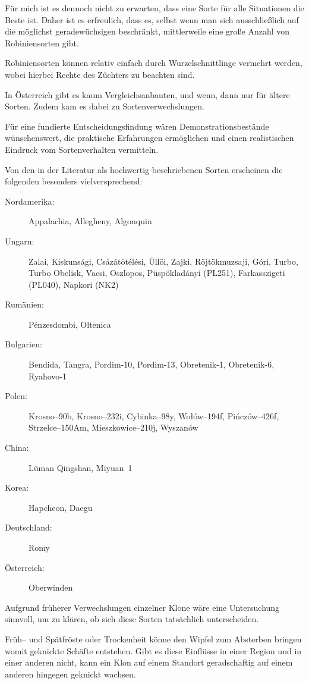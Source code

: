 \documentclass[twocolumn]{scrartcl}
\begin{document}
Für mich ist es dennoch nicht zu erwarten, dass eine Sorte für alle
Situationen die Beste ist. Daher ist es erfreulich, dass es, selbst
wenn man sich ausschließlich auf die möglichst geradewüchsigen
beschränkt, mittlerweile eine große Anzahl von Robiniensorten gibt.

Robiniensorten können relativ einfach durch Wurzelschnittlinge
vermehrt werden, wobei hierbei Rechte des Züchters zu beachten sind.

In Österreich gibt es kaum Vergleichsanbauten, und wenn, dann nur für
ältere Sorten. Zudem kam es dabei zu Sortenverwechslungen.

Für eine fundierte Entscheidungsfindung wären Demonstrationsbestände
wünschenswert, die praktische Erfahrungen ermöglichen und einen
realistischen Eindruck vom Sortenverhalten vermitteln.

Von den in der Literatur als hochwertig beschriebenen Sorten
erscheinen die folgenden besonders vielversprechend:

\begin{description}
  \item[Nordamerika:] Appalachia, Allegheny, Algonquin
  \item[Ungarn:] Zalai, Kiskunsági, Csázátötélési, Üllöi, Zajki, Röjtökmuzsaji, Góri, Turbo, Turbo Obelisk, Vacsi, Oszlopos, Püspökladányi (PL251), Farkasszigeti (PL040), Napkori (NK2)
  \item[Rumänien:] Pénzesdombi, Oltenica
  \item[Bulgarien:] Bendida, Tangra, Pordim-10, Pordim-13, Obretenik-1, Obretenik-6, Ryahovo-1
  \item[Polen:] Krosno--90b, Krosno--232i, Cybinka--98y, Wołów--194f, Pińczów--426f, Strzelce--150Am, Mieszkowice--210j, Wyszanów
  \item[China:] Lüman Qingshan, Miyuan~1
  \item[Korea:] Hapcheon, Daegu
  \item[Deutschland:] Romy
  \item[Österreich:] Oberwinden
\end{description}

Aufgrund früherer Verwechslungen einzelner Klone
\citep{heinze2014robinie,liesebach2012robinie} wäre eine Untersuchung
sinnvoll, um zu klären, ob sich diese Sorten tatsächlich
unterscheiden.

Früh-- und Spätfröste oder Trockenheit könne den Wipfel zum Absterben
bringen womit geknickte Schäfte entstehen. Gibt es diese Einflüsse in
einer Region und in einer anderen nicht, kann ein Klon auf einem
Standort geradschaftig auf einem anderen hingegen geknickt wachsen.
\end{document}
